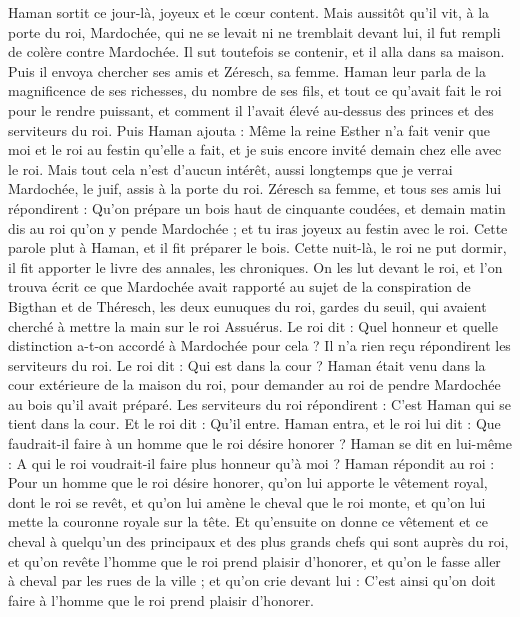 \begin{multicols}{2}
Haman sortit ce jour-là, joyeux et le cœur content. Mais aussitôt qu'il vit, à la porte du roi, Mardochée, qui ne se levait ni ne tremblait devant lui, il fut rempli de colère contre Mardochée.
Il sut toutefois se contenir, et il alla dans sa maison. Puis il envoya chercher ses amis et Zéresch, sa femme.
Haman leur parla de la magnificence de ses richesses, du nombre de ses fils, et tout ce qu’avait fait le roi pour le rendre puissant, et comment il l'avait élevé au-dessus des princes et des serviteurs du roi.
Puis Haman ajouta : Même la reine Esther n'a fait venir que moi et le roi au festin qu'elle a fait, et je suis encore invité demain chez elle avec le roi.
Mais tout cela n’est d’aucun intérêt, aussi longtemps que je verrai Mardochée, le juif, assis à la porte du roi.
Zéresch sa femme, et tous ses amis lui répondirent : Qu'on prépare un bois haut de cinquante coudées, et demain matin dis au roi qu'on y pende Mardochée ; et tu iras joyeux au festin avec le roi. Cette parole plut à Haman, et il fit préparer le bois.
\VerseOne{}Cette nuit-là, le roi ne put dormir, il fit apporter le livre des annales, les chroniques. On les lut devant le roi,
et l’on trouva écrit ce que Mardochée avait rapporté au sujet de la conspiration de Bigthan et de Théresch, les deux eunuques du roi, gardes du seuil, qui avaient cherché à mettre la main sur le roi Assuérus.
Le roi dit : Quel honneur et quelle distinction a-t-on accordé à Mardochée pour cela ? Il n’a rien reçu répondirent les serviteurs du roi.
Le roi dit : Qui est dans la cour ? Haman était venu dans la cour extérieure de la maison du roi, pour demander au roi de pendre Mardochée au bois qu'il avait préparé.
Les serviteurs du roi répondirent : C’est Haman qui se tient dans la cour. Et le roi dit : Qu'il entre.
Haman entra, et le roi lui dit : Que faudrait-il faire à un homme que le roi désire honorer ? Haman se dit en lui-même : A qui le roi voudrait-il faire plus honneur qu'à moi ?
Haman répondit au roi : Pour un homme que le roi désire honorer,
qu’on lui apporte le vêtement royal, dont le roi se revêt, et qu'on lui amène le cheval que le roi monte, et qu'on lui mette la couronne royale sur la tête.
Et qu'ensuite on donne ce vêtement et ce cheval à quelqu'un des principaux et des plus grands chefs qui sont auprès du roi, et qu'on revête l'homme que le roi prend plaisir d'honorer, et qu'on le fasse aller à cheval par les rues de la ville ; et qu'on crie devant lui : C'est ainsi qu'on doit faire à l'homme que le roi prend plaisir d'honorer.

\end{multicols}
